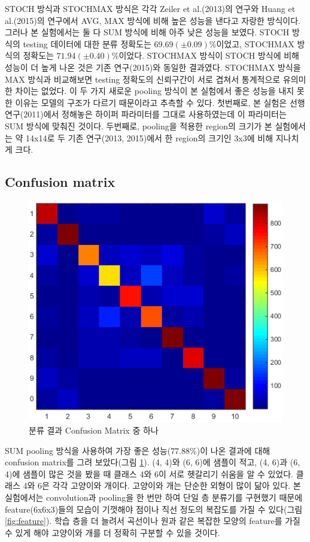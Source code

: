 \documentclass[a4paper,9pt]{article}
\begin{document}
\begin{multicols*}{2}
STOCH 방식과 STOCHMAX 방식은 각각 Zeiler et al.(2013)의 연구와 Huang et al.(2015)의 연구에서 AVG, MAX 방식에 비해 높은 성능을 낸다고 자랑한 방식이다.
그러나 본 실험에서는 둘 다 SUM 방식에 비해 아주 낮은 성능을 보였다.
STOCH 방식의 testing 데이터에 대한 분류 정확도는 $69.69(\pm 0.09)$\%이었고, STOCHMAX 방식의 정확도는 $71.94(\pm 0.40)$\%이었다.
STOCHMAX 방식이 STOCH 방식에 비해 성능이 더 높게 나온 것은 기존 연구(2015)와 동일한 결과였다.
STOCHMAX 방식을 MAX 방식과 비교해보면 testing 정확도의 신뢰구간이 서로 겹쳐서 통계적으로 유의미한 차이는 없었다.
이 두 가지 새로운 pooling 방식이 본 실험에서 좋은 성능을 내지 못한 이유는 모델의 구조가 다르기 때문이라고 추측할 수 있다.
첫번째로, 본 실험은 선행 연구(2011)에서 정해놓은 하이퍼 파라미터를 그대로 사용하였는데 이 파라미터는 SUM 방식에 맞춰진 것이다.
두번째로, pooling을 적용한 region의 크기가 본 실험에서는 약 14x14로 두 기존 연구(2013, 2015)에서 한 region의 크기인 3x3에 비해 지나치게 크다.

\subsection{Confusion matrix}

\begin{figure}[H]
\includegraphics[width=\linewidth]{confusion_matrix}
\caption{분류 결과 Confusion Matrix 중 하나}
\label{fig:confusion_matrix}
\end{figure}

SUM pooling 방식을 사용하여 가장 좋은 성능($77.88$\%)이 나온 결과에 대해 confusion matrix를 그려 보았다(그림 \ref{fig:confusion_matrix}).
(4, 4)와 (6, 6)에 샘플이 적고, (4, 6)과 (6, 4)에 샘플이 많은 것을 봤을 때 클래스 4와 6이 서로 헷갈리기 쉬움을 알 수 있었다.
클래스 4와 6은 각각 고양이와 개이다.
고양이와 개는 단순한 외형이 많이 닮아 있다.
본 실험에서는 convolution과 pooling을 한 번만 하여 단일 층 분류기를 구현했기 때문에 feature(6x6x3)들의 모습이 기껏해야 점이나 직선 정도의 복잡도를 가질 수 있다(그림 \ref{fig:feature}).
학습 층을 더 늘려서 곡선이나 원과 같은 복잡한 모양의 feature를 가질 수 있게 해야 고양이와 개를 더 정확히 구분할 수 있을 것이다.


\end{multicols*}
\end{document}
